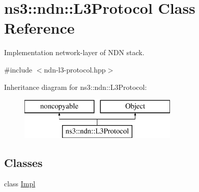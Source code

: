 \hypertarget{classns3_1_1ndn_1_1L3Protocol}{}\section{ns3\+:\+:ndn\+:\+:L3\+Protocol Class Reference}
\label{classns3_1_1ndn_1_1L3Protocol}


Implementation network-\/layer of N\+DN stack.  




{\ttfamily \#include $<$ndn-\/l3-\/protocol.\+hpp$>$}

Inheritance diagram for ns3\+:\+:ndn\+:\+:L3\+Protocol\+:\begin{figure}[H]
\begin{center}
\leavevmode
\includegraphics[height=2.000000cm]{classns3_1_1ndn_1_1L3Protocol}
\end{center}
\end{figure}
\subsection*{Classes}
\begin{DoxyCompactItemize}
\item 
class \hyperlink{classns3_1_1ndn_1_1L3Protocol_1_1Impl}{Impl}
\end{DoxyCompactItemize}
